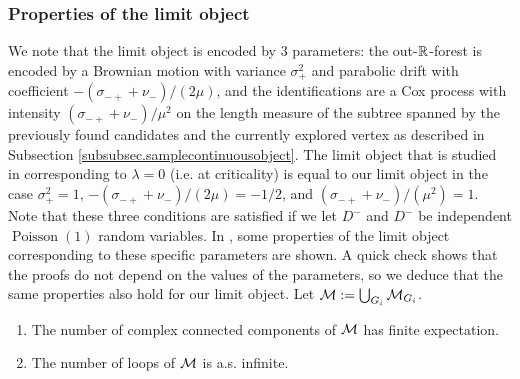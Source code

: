 \subsubsection{Properties of the limit object}
We note that the limit object is encoded by $3$ parameters: the out-${\mathbb R}$-forest is encoded by a Brownian motion with variance $\sigma_+^2$ and parabolic drift with coefficient $-(\sigma_{-+}+\nu_-)/(2\mu)$, and the identifications are a Cox process with intensity $(\sigma_{-+}+\nu_-)/\mu^2$ on the length measure of the subtree spanned by the previously found candidates and the currently explored vertex as described in Subsection \ref{subsubsec.samplecontinuousobject}. The limit object that is studied in \cite{goldschmidtScalingLimitCritical2019} corresponding to $\lambda=0$ (i.e. at criticality) is equal to our limit object in the case $\sigma_+^2=1$, $-(\sigma_{-+}+\nu_-)/(2\mu)=-1/2$, and $(\sigma_{-+}+\nu_-)/(\mu^2)=1$. Note that these three conditions are satisfied if we let $D^-$ and $D^-$ be independent $\operatorname{Poisson}(1)$ random variables. In \cite{goldschmidtScalingLimitCritical2019}, some properties of the limit object corresponding to these specific parameters are shown. A quick check shows that the proofs do not depend on the values of the parameters, so we deduce that the same properties also hold for our limit object. Let ${\mathcal M}:=\bigcup_{G_i}{\mathcal M}_{G_i}$.

\begin{proposition}
\begin{enumerate}
    \item The number of complex connected components of ${\mathcal M}$ has finite expectation.
    \item The number of loops of ${\mathcal M}$ is a.s. infinite.
\end{enumerate}
\end{proposition}

